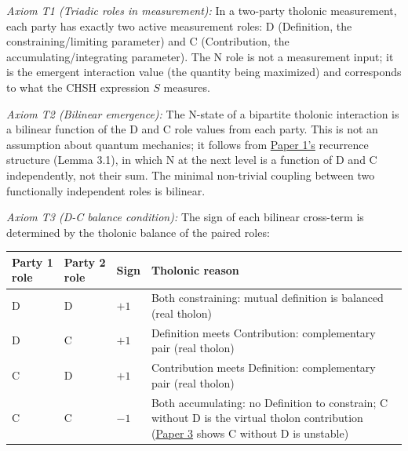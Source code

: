 \documentclass[12pt]{article}
\begin{document}
\emph{Axiom T1 (Triadic roles in measurement):} In a two-party tholonic
measurement, each party has exactly two active measurement roles: D
(Definition, the constraining/limiting parameter) and C (Contribution,
the accumulating/integrating parameter). The N role is not a measurement
input; it is the emergent interaction value (the quantity being
maximized) and corresponds to what the CHSH expression \(S\) measures.

\emph{Axiom T2 (Bilinear emergence):} The N-state of a bipartite
tholonic interaction is a bilinear function of the D and C role values
from each party. This is not an assumption about quantum mechanics; it
follows from
\href{https://github.com/baardev/truevalue/blob/main/docnav/Research/papers/1_recursive-tholonic-five-constants/1_recursive-tholonic-five-constants.pdf}{Paper
1's} recurrence structure (Lemma 3.1), in which N at the next level is a
function of D and C independently, not their sum. The minimal
non-trivial coupling between two functionally independent roles is
bilinear.

\emph{Axiom T3 (D-C balance condition):} The sign of each bilinear
cross-term is determined by the tholonic balance of the paired roles:

\begin{longtable}[]{@{}
  >{\centering\arraybackslash}p{}
  >{\centering\arraybackslash}p{}
  >{\centering\arraybackslash}p{}
  >{\raggedright\arraybackslash}p{}@{}}
\toprule\noalign{}
\begin{minipage}[b]{\linewidth}\centering
Party 1 role
\end{minipage} & \begin{minipage}[b]{\linewidth}\centering
Party 2 role
\end{minipage} & \begin{minipage}[b]{\linewidth}\centering
Sign
\end{minipage} & \begin{minipage}[b]{\linewidth}\raggedright
Tholonic reason
\end{minipage} \\
\midrule\noalign{}
\endhead
\bottomrule\noalign{}
\endlastfoot
D & D & \(+1\) & Both constraining: mutual definition is balanced (real
tholon) \\
D & C & \(+1\) & Definition meets Contribution: complementary pair (real
tholon) \\
C & D & \(+1\) & Contribution meets Definition: complementary pair (real
tholon) \\
C & C & \(-1\) & Both accumulating: no Definition to constrain; C
without D is the virtual tholon contribution
(\href{https://github.com/baardev/truevalue/blob/main/docnav/Research/papers/3_minimal-recursive-triadic-framework/3_minimal-recursive-triadic-framework.pdf}{Paper
3} shows C without D is unstable) \\
\end{longtable}
\end{document}
